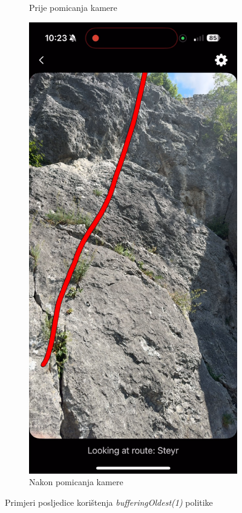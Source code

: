 \begin{figure}[H]
\begin{subfigure}[b]{0.45\textwidth}
        \caption{Prije pomicanja kamere}
        \label{fig:steyr_bad_detection_2a}
    \end{subfigure}
    \hfill
    \begin{subfigure}[b]{0.45\textwidth}
        \centering
        \includegraphics[width=\textwidth]{images/testiranje/steyr_bad_detection_after_moving.png}
        \caption{Nakon pomicanja kamere}
        \label{fig:steyr_bad_detection_2b}
    \end{subfigure}
    \caption{Primjeri posljedice korištenja \textit{bufferingOldest(1)} politike}
    \label{fig:steyr_bad_detection_double_2}
\end{figure}

